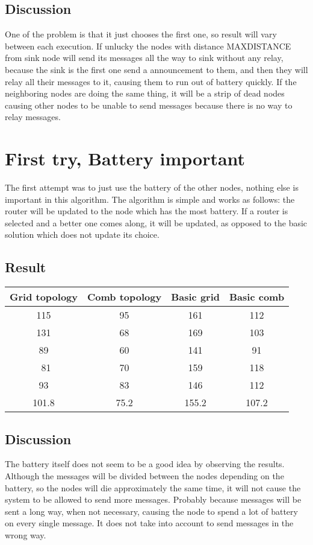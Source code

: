 \documentclass{article}
\begin{document}
  \subsection{Discussion}
   One of the problem is that it just chooses the first one,
   so result will vary between each execution.
   If unlucky the nodes with distance MAXDISTANCE from
   sink node will send its messages all the way to sink
   without any relay, because the sink is the first one
   send a announcement to them, and then they will relay
   all their messages to it, causing them to run out of
   battery quickly. If the neighboring nodes
   are doing the same thing, it will be a strip of dead
   nodes causing other nodes to be unable to send messages
   because there is no way to relay messages.

\section{First try, Battery important}
  The first attempt was to just use the battery of the other nodes, 
  nothing else is important in this algorithm. The algorithm is simple
  and works as follows: the router will be updated to the node which 
  has the most battery. If a router is selected and a better one
  comes along, it will be updated, as opposed to the basic solution
  which does not update its choice.
  
  \subsection{Result}
    \begin{tabular}{c|c||c|c}
      Grid topology & Comb topology & Basic grid & Basic comb\\
      \hline
      \hline
      115 & 95 & 161 & 112\\
      131 & 68 & 169 & 103\\
      89  & 60 & 141 & 91\\\
      81  & 70 & 159 & 118\\
      93  & 83 & 146 & 112\\
      \hline
      101.8&75.2&155.2&107.2\\

      
    \end{tabular}
  \subsection{Discussion}
   The battery itself does not seem to be a good idea by observing the results.
   Although the messages will be divided between the nodes depending on the battery,
   so the nodes will die approximately the same time, it will not cause the
   system to be allowed to send more messages. Probably because messages will be sent
   a long way, when not necessary, causing the node to spend a lot of battery on
   every single message.
   It does not take into account to send messages in the wrong way.
\end{document}
